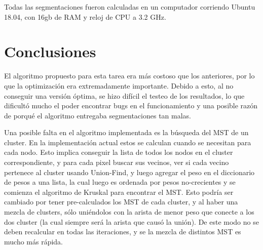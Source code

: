 \documentclass[letterpaper,11pt]{article} %
\begin{document}
  Todas las segmentaciones fueron calculadas en un computador corriendo Ubuntu 18.04, con 16gb de RAM y reloj de CPU a 3.2 GHz. 

\section{Conclusiones}
  El algoritmo propuesto para esta tarea era más costoso que los anteriores, por lo que la optimización era extremadamente importante. Debido a esto, al no conseguir una versión óptima, se hizo difícil el testeo de los resultados, lo que dificultó mucho el poder encontrar bugs en el funcionamiento y una posible razón de porqué el algoritmo entregaba segmentaciones tan malas.

  Una posible falta en el algoritmo implementada es la búsqueda del MST de un cluster. En la implementación actual estos se calculan cuando se necesitan para cada nodo. Esto implica conseguir la lista de todos los nodos en el cluster correspondiente, y para cada pixel buscar sus vecinos, ver si cada vecino pertenece al cluster usando Union-Find, y luego agregar el peso en el diccionario de pesos a una lista, la cual luego es ordenada por pesos no-crecientes y se comienza el algoritmo de Kruskal para encontrar el MST. Esto podría ser cambiado por tener pre-calculados los MST de cada cluster, y al haber una mezcla de clusters, sólo uniéndolos con la arista de menor peso que conecte a los dos cluster (la cual siempre será la arista que causó la unión). De este modo no se deben recalcular en todas las iteraciones, y se la mezcla de distintos MST es mucho más rápida. 

\end{document}
